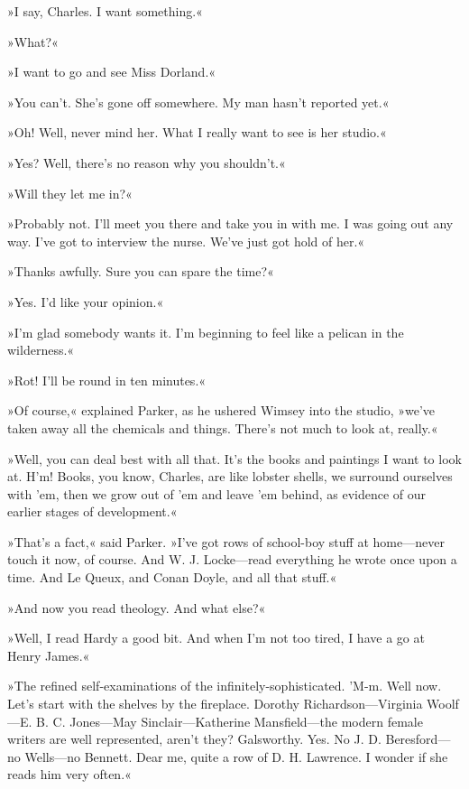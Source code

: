 »I say, Charles. I want something.«

»What?«

»I want to go and see Miss Dorland.«

»You can't. She's gone off somewhere. My man hasn't reported yet.«

»Oh! Well, never mind her. What I really want to see is her studio.«

»Yes? Well, there's no reason why you shouldn't.«

»Will they let me in?«

»Probably not. I'll meet you there and take you in with me. I was going out any way. I've got to interview the nurse. We've just got hold of her.«

»Thanks awfully. Sure you can spare the time?«

»Yes. I'd like your opinion.«

»I'm glad somebody wants it. I'm beginning to feel like a pelican in the wilderness.«

»Rot! I'll be round in ten minutes.«

»Of course,« explained Parker, as he ushered Wimsey into the studio, »we've taken away all the chemicals and things. There's not much to look at, really.«

»Well, you can deal best with all that. It's the books and paintings I want to look at. H'm! Books, you know, Charles, are like lobster shells, we surround ourselves with 'em, then we grow out of 'em and leave 'em behind, as evidence of our earlier stages of development.«

»That's a fact,« said Parker. »I've got rows of school-boy stuff at home\allowbreak---\allowbreak never touch it now, of course. And W. J. Locke\allowbreak---\allowbreak read everything he wrote once upon a time. And Le Queux, and Conan Doyle, and all that stuff.«

»And now you read theology. And what else?«

»Well, I read Hardy a good bit. And when I'm not too tired, I have a go at Henry James.«

»The refined self-examinations of the infinitely-sophisticated. 'M-m. Well now. Let's start with the shelves by the fireplace. Dorothy Richardson\allowbreak---\allowbreak Virginia Woolf\allowbreak---\allowbreak E. B. C. Jones\allowbreak---\allowbreak May Sinclair\allowbreak---\allowbreak Katherine Mansfield\allowbreak---\allowbreak the modern female writers are well represented, aren't they? Galsworthy. Yes. No J. D. Beresford\allowbreak---\allowbreak no Wells\allowbreak---\allowbreak no Bennett. Dear me, quite a row of D. H. Lawrence. I wonder if she reads him very often.«

